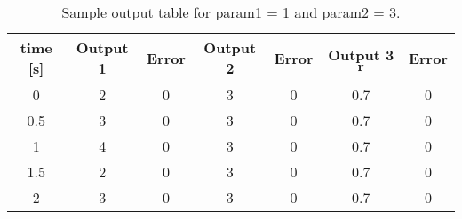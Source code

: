 \begin{table}[htbp]
\caption{Sample output table for param1 = 1 and param2 = 3.}
\label{tbl:test13}
\centering
\begin{tabular}{ccccccc}
\hline
  time [s]  &  Output 1  &  Error  &  Output 2  &  Error  &  Output 3 $\bm r$  &  Error  \\
\hline
     0      &     2      &    0    &     3      &    0    &        0.7         &    0    \\
    0.5     &     3      &    0    &     3      &    0    &        0.7         &    0    \\
     1      &     4      &    0    &     3      &    0    &        0.7         &    0    \\
    1.5     &     2      &    0    &     3      &    0    &        0.7         &    0    \\
     2      &     3      &    0    &     3      &    0    &        0.7         &    0    \\
\hline
\end{tabular}\end{table}